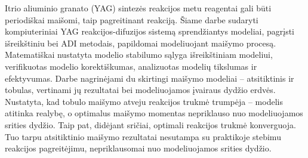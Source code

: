 
Itrio aliuminio granato (YAG) sintezės reakcijos metu reagentai gali būti periodiškai maišomi, taip pagreitinant reakciją. Šiame darbe sudaryti kompiuteriniai YAG reakcijos-difuzijos sistemą sprendžiantys modeliai, pagrįsti išreikštiniu bei ADI metodais, papildomai modeliuojant maišymo procesą. Matematiškai nustatyta modelio stabilumo sąlyga išreikštiniam modeliui, verifikuotas modelio korektiškumas, analizuotas modelių tikslumas ir efektyvumas. Darbe nagrinėjami du skirtingi maišymo modeliai -- atsitiktinis ir tobulas, vertinami jų rezultatai bei modeliuojamos įvairaus dydžio erdvės. Nustatyta, kad tobulo maišymo atveju reakcijos trukmė trumpėja -- modelis atitinka realybę, o optimalus maišymo momentas nepriklauso nuo modeliuojamos srities dydžio. Taip pat, didėjant sričiai, optimali reakcijos trukmė konverguoja. Tuo tarpu atsitiktinio maišymo rezultatai nesutampa su praktikoje stebimu reakcijos pagreitėjimu, nepriklausomai nuo modeliuojamos srities dydžio.

\newpage 


\newpage 